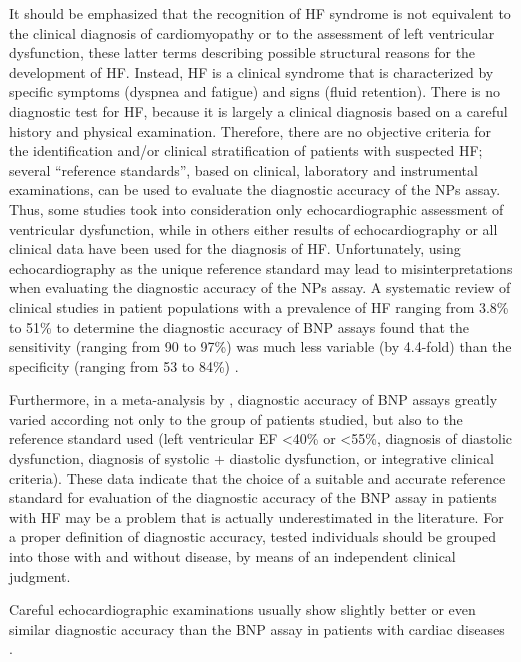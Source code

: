 \documentclass[14pt,a4paper,onecolumn]{extarticle}
\begin{document}
It should be emphasized that the recognition of HF syndrome is not equivalent to the clinical diagnosis of cardiomyopathy or to the assessment of left ventricular dysfunction, these latter terms describing possible structural reasons for the development of HF. Instead, HF is a clinical syndrome that is characterized by specific symptoms (dyspnea and fatigue) and signs (fluid retention). There is no diagnostic test for HF, because it is largely a clinical diagnosis based on a careful history and physical examination. Therefore, there are no objective criteria for the identification and/or clinical stratification of patients with suspected HF; several “reference standards”, based on clinical, laboratory and instrumental examinations, can be used to evaluate the diagnostic accuracy of the NPs assay. Thus, some studies took into consideration only echocardiographic assessment of ventricular dysfunction, while in others either results of echocardiography or all clinical data have been used for the diagnosis of HF.  Unfortunately, using echocardiography as the unique reference standard may lead to misinterpretations when evaluating the diagnostic accuracy of the NPs assay. A systematic review of clinical studies in patient populations with a prevalence of HF ranging from 3.8\% to 51\% to determine the diagnostic accuracy of BNP assays found that the sensitivity (ranging from 90 to 97\%) was much less variable (by 4.4-fold) than the specificity (ranging from 53 to 84\%) \citep{bib35}.



Furthermore, in a meta-analysis by \citep{bib372}, diagnostic accuracy of BNP assays greatly varied according not only to the group of patients studied, but also to the reference standard used (left ventricular EF <40\% or <55\%, diagnosis of diastolic dysfunction, diagnosis of systolic + diastolic dysfunction, or integrative clinical criteria). These data indicate that the choice of a suitable and accurate reference standard for evaluation of the diagnostic accuracy of the BNP assay in patients with HF may be a problem that is actually underestimated in the literature. For a proper definition of diagnostic accuracy, tested individuals should be grouped into those with and without disease, by means of an independent clinical judgment.



Careful echocardiographic examinations usually show slightly better or even similar diagnostic accuracy than the BNP assay in patients with cardiac diseases \citep{bib3178}.
\end{document}

